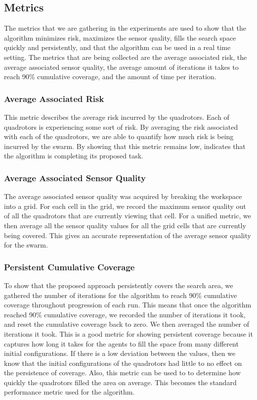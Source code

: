 \documentclass{article}
\begin{document}
\subsection{Metrics}

The metrics that we are gathering in the experiments are used to show that the
algorithm minimizes risk, maximizes the sensor quality, fills the search space
quickly and persistently, and that the algorithm can be used in a real time
setting. The metrics that are being collected are the average associated risk,
the average associated sensor quality, the average amount of iterations it
takes to reach 90\% cumulative coverage, and the amount of time per iteration.

\subsubsection{Average Associated Risk}

This metric describes the average risk incurred by the quadrotors. Each of
quadrotors is experiencing some sort of risk. By averaging the risk associated
with each of the quadrotors, we are able to quantify how much risk is being
incurred by the swarm. By showing that this metric remains low, indicates that
the algorithm is completing its proposed task.

\subsubsection{Average Associated Sensor Quality}

The average associated sensor quality was acquired by breaking the workspace
into a grid. For each cell in the grid, we record the maximum sensor quality
out of all the quadrotors that are currently viewing that cell. For a unified
metric, we then average all the sensor quality values for all the grid cells
that are currently being covered. This gives an accurate representation of the
average sensor quality for the swarm.

\subsubsection{Persistent Cumulative Coverage}

To show that the proposed approach persistently covers the search area, we
gathered the number of iterations for the algorithm to reach 90\% cumulative
coverage throughout progression of each run. This means that once the algorithm
reached 90\% cumulative coverage, we recorded the number of iterations it took,
and reset the cumulative coverage back to zero. We then averaged the number of
iterations it took. This is a good metric for showing persistent coverage
because it captures how long it takes for the agents to fill the space from
many different initial configurations. If there is a low deviation between the
values, then we know that the initial configurations of the quadrotors had
little to no effect on the persistence of coverage. Also, this metric can be
used to to determine how quickly the quadrotors filled the area on average.
This becomes the standard performance metric used for the algorithm.
\end{document}
